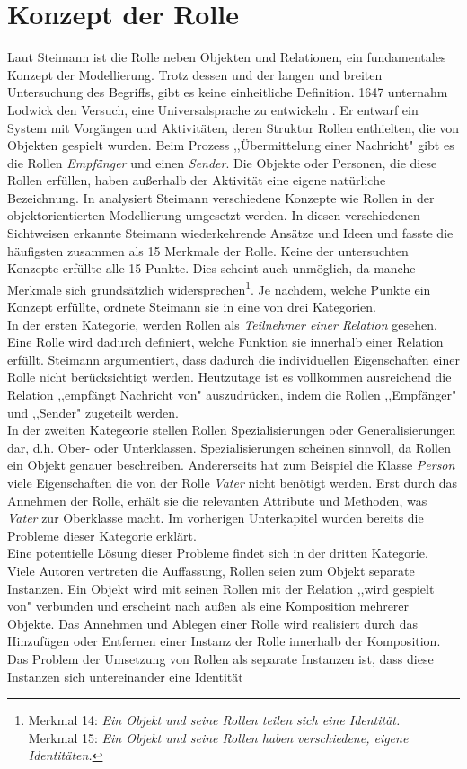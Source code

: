 \documentclass[conference]{IEEEtran}
\begin{document}
\section{Konzept der Rolle}Laut Steimann ist die Rolle neben Objekten und Relationen, ein fundamentales Konzept der Modellierung. Trotz dessen und der langen und breiten Untersuchung des Begriffs, gibt es keine einheitliche Definition. 1647 unternahm Lodwick den Versuch, eine Universalsprache zu entwickeln \cite{hunter2012lodwick}. Er entwarf ein System mit Vorgängen und Aktivitäten, deren Struktur Rollen enthielten, die von Objekten gespielt wurden. Beim Prozess ,,Übermittelung einer Nachricht" gibt es die Rollen \textit{Empfänger} und einen \textit{Sender}. Die Objekte oder Personen, die diese Rollen erfüllen, haben außerhalb der Aktivität eine eigene natürliche Bezeichnung. In \cite{steimann2000representation} analysiert Steimann verschiedene Konzepte wie Rollen in der objektorientierten Modellierung umgesetzt werden. In diesen verschiedenen Sichtweisen erkannte Steimann wiederkehrende Ansätze und Ideen und fasste die häufigsten zusammen als 15 Merkmale der Rolle. Keine der untersuchten Konzepte erfüllte alle 15 Punkte. Dies scheint auch unmöglich, da manche Merkmale sich grundsätzlich widersprechen\footnote { Merkmal 14: \textit{Ein Objekt und seine Rollen teilen sich eine Identität.} \\Merkmal 15: \textit{Ein Objekt und seine Rollen haben verschiedene, eigene Identitäten.}}. Je nachdem, welche Punkte ein Konzept erfüllte, ordnete Steimann sie in eine von drei Kategorien. \\ In der ersten Kategorie, werden Rollen als \textit{Teilnehmer einer Relation} gesehen. Eine Rolle wird dadurch definiert, welche Funktion sie innerhalb einer Relation erfüllt. Steimann argumentiert, dass dadurch die individuellen Eigenschaften einer Rolle nicht berücksichtigt werden.  Heutzutage ist es vollkommen ausreichend die Relation ,,empfängt Nachricht von" auszudrücken, indem die Rollen ,,Empfänger" und ,,Sender" zugeteilt werden. \\ In der zweiten Kategeorie stellen Rollen Spezialisierungen oder Generalisierungen dar, d.h. Ober- oder Unterklassen. Spezialisierungen scheinen sinnvoll, da Rollen ein Objekt genauer beschreiben. Andererseits hat zum Beispiel die Klasse \textit{Person} viele Eigenschaften die von der Rolle \textit{Vater} nicht benötigt werden. Erst durch das Annehmen der Rolle, erhält sie die relevanten Attribute und Methoden, was \textit{Vater} zur Oberklasse macht. Im vorherigen Unterkapitel wurden bereits die Probleme dieser Kategorie erklärt.\\ Eine potentielle Lösung dieser Probleme findet sich in der dritten Kategorie. Viele Autoren vertreten die Auffassung, Rollen seien  zum Objekt separate Instanzen. Ein Objekt wird mit seinen Rollen mit der Relation ,,wird gespielt von" verbunden und erscheint nach außen als eine Komposition mehrerer Objekte. Das Annehmen und Ablegen einer Rolle wird realisiert durch das Hinzufügen oder Entfernen einer Instanz der Rolle innerhalb der Komposition. Das Problem der Umsetzung von Rollen als separate Instanzen ist, dass diese Instanzen sich untereinander eine Identität 
\end{document}
